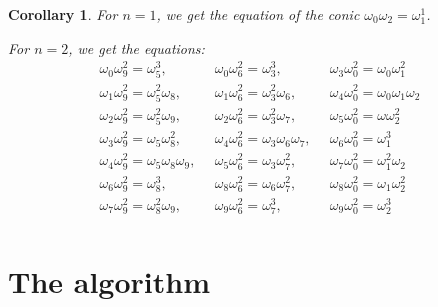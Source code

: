 \documentclass[a4paper,10pt]{amsart}
\theoremstyle{plain}
\newtheorem{corollary}[theorem]{Corollary}
\theoremstyle{definition}
\theoremstyle{remark}
\numberwithin{equation}{section}
\begin{document}
\begin{corollary}\label{cor_eqP2} For $n=1$, we get the equation of the conic $\omega_0\omega_2=\omega^{1}_{1}$. 
	
	For $n=2$, we get the equations:
	$$\begin{array}{ccc}
	\omega_0\omega_{9}^2=\omega_{5}^{3},\,\,\, & \omega_0\omega_{6}^2=\omega_{3}^{3},\,\,\, &\omega_3\omega_{0}^2=\omega_0\omega_{1}^{2}\\
	\omega_1\omega_{9}^2=\omega_{5}^{2}\omega_8,\,\,\, & \omega_1\omega_{6}^2=\omega_{3}^{2}\omega_6,\,\,\, &\omega_4\omega_{0}^2=\omega_{0}\omega_1\omega_2\\
	\omega_2\omega_{9}^2=\omega_{5}^{2}\omega_9,\,\,\, & \omega_2\omega_{6}^2=\omega_{3}^{2}\omega_{7},\,\,\, &  \omega_5\omega_{0}^2=\omega\omega_{2}^{2}\\
	\omega_3\omega_{9}^2=\omega_{5}\omega_8^{2},\,\,\, & \omega_4\omega_{6}^2=\omega_{3}\omega_6\omega_{7},\,\,\, &\omega_6\omega_{0}^2=\omega_1^{3}\\
	\omega_4\omega_{9}^2=\omega_{5}\omega_8\omega_9,\,\,\, & \omega_5\omega_{6}^2=\omega_{3}\omega_{7}^2,\,\,\, &\omega_7\omega_{0}^2=\omega_{1}^2\omega_2\\
	\omega_6\omega_{9}^2=\omega_8^{3},\,\,\, & \omega_8\omega_{6}^2=\omega_6\omega_7^{2},\,\,\, &  \omega_8\omega_{0}^2=\omega_1\omega_2^{2}\\
	\omega_7\omega_{9}^2=\omega_{8}^{2}\omega_9,\,\,\, & \omega_9\omega_{6}^2=\omega_{7}^{3},\,\,\, &  \omega_9\omega_{0}^2=\omega_{2}^{3}\\
	\end{array}$$
\end{corollary}

\section{The algorithm}\label{Sec-Algorithm}
\end{document}
